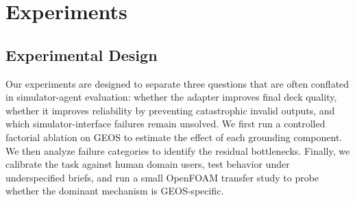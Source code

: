 \documentclass{article}
\begin{document}

\section{Experiments}
\label{sec:eval}







\subsection{Experimental Design}

Our experiments are designed to separate three questions that are often conflated in simulator-agent evaluation: 
whether the adapter improves final deck quality, whether it improves reliability by preventing catastrophic invalid 
outputs, and which simulator-interface failures remain unsolved. We first run a controlled factorial ablation on GEOS 
to estimate the effect of each grounding component. We then analyze failure categories to identify the residual 
bottlenecks. Finally, we calibrate the task against human domain users, test behavior under underspecified briefs, 
and run a small OpenFOAM transfer study to probe whether the dominant mechanism is GEOS-specific.
\end{document}
